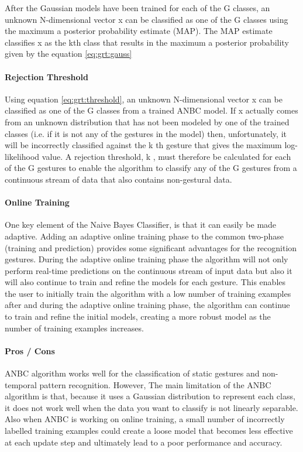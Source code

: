 

After the Gaussian models have been trained for each of the G classes, an unknown N-dimensional vector x can be classified as one of the G classes using the maximum a posterior probability estimate (MAP). The MAP estimate classifies x as the kth class that results in the maximum a posterior probability given by the equation \ref{eq:grt:gauss}



\paragraph*{Rejection Threshold} Using equation \ref{eq:grt:threshold}, an unknown N-dimensional vector x can be classified as one of the G classes from a trained ANBC model. If x actually comes from an unknown distribution that has not been modeled by one of the trained classes (i.e. if it is not any of the gestures in the model) then, unfortunately, it will be incorrectly classified against the k th gesture that gives the maximum log-likelihood value. A rejection threshold, k , must therefore be calculated for each of the G gestures to enable the algorithm to classify any of the G gestures from a continuous stream of data that also contains non-gestural data.

\paragraph*{Online Training} One key element of the Naive Bayes Classifier, is that it can easily be made adaptive. Adding an adaptive online training phase to the common two-phase (training and prediction) provides some significant advantages for the recognition gestures. During the adaptive online training phase the algorithm will not only perform real-time predictions on the continuous stream of input data but also it will also continue to train and refine the models for each gesture. This enables the user to initially train the algorithm with a low number of training examples after and during the adaptive online training phase, the algorithm can continue to train and refine the initial models, creating a more robust model as the number of training examples increases.

\paragraph*{Pros / Cons} ANBC algorithm works well for the classification of static gestures and non-temporal pattern recognition. However, The main limitation of the ANBC algorithm is that, because it uses a Gaussian distribution to represent each class, it does not work well when the data you want to classify is not linearly separable. Also when ANBC is working on online training, a small number of incorrectly labelled training examples could create a loose model that becomes less effective at each update step and ultimately lead to a poor performance and accuracy.

